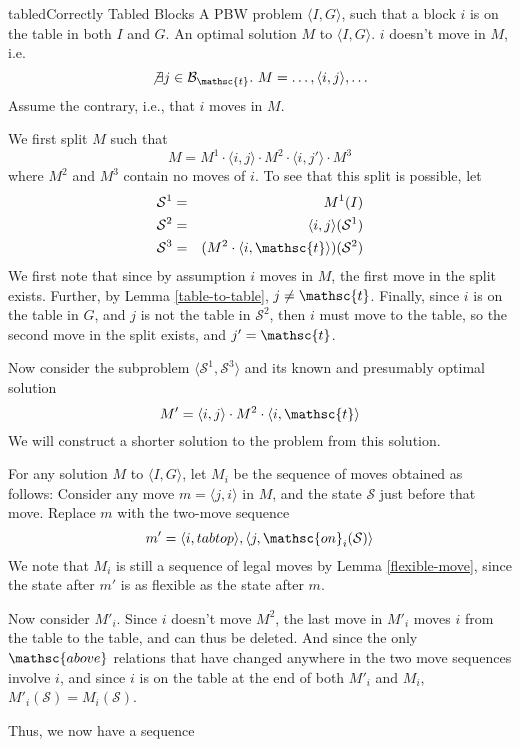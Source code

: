 \documentclass{article}
\newcommand{\have}{{.~}}
\newcommand{\bstate}{{\mathcal{S}}}
\newcommand{\blocks}{{\mathcal{B}}}
\newcommand{\tabtop}{{\mathsc{t}}}
\newcommand{\tblocks}{{\blocks_\tabtop}}
\newcommand{\bon}{{\mathsc{on}}}
\newcommand{\babove}{{\mathsc{above}}}
\begin{document}
\begin{lemma}{tabled}{Correctly Tabled Blocks}
\given
A PBW problem $\langle I, G \rangle$, such that
a block $i$ is on the table in both $I$ and $G$.
An optimal solution $M$ to $\langle I, G \rangle$.
\prove
$i$ doesn't move in $M$, i.e. $$
  \not\exists j \in \tblocks \have
    M = \ldots, \langle i, j \rangle, \ldots
$$
\proof
Assume the contrary, i.e., that $i$ moves in $M$.

We first split $M$ such that $$
  M = M^1 \cdot \langle i, j \rangle \cdot M^2 \cdot
  \langle i, j' \rangle \cdot M^3
$$
where $M^2$ and $M^3$ contain no moves of $i$.
To see that this split is possible, let
\begin{eqnarray*}
\bstate^1 &=& M^1(I) \\
\bstate^2 &=& \langle i, j \rangle(\bstate^1) \\
\bstate^3 &=& (M^2 \cdot \langle i, \tabtop \rangle)(\bstate^2)
\end{eqnarray*}
We first note
that since by assumption $i$ moves in $M$, the first
move in the split exists.  Further, by Lemma
\ref{table-to-table}, $j \neq \tabtop$.
Finally, since $i$ is on the table in $G$, and
$j$ is not the table in $\bstate^2$, then $i$ must move
to the table, so the second move in the split exists, and $j' = \tabtop$.

Now consider the subproblem $\langle \bstate^1, \bstate^3 \rangle$
and its known and presumably optimal solution $$
  M' = \langle i, j \rangle \cdot M^2 \cdot \langle i, \tabtop \rangle
$$
We will construct a shorter solution to the problem from this
solution.

For any solution $M$ to $\langle I, G \rangle$,
let $M_i$ be the sequence of moves obtained as follows:
Consider any move $m = \langle j, i \rangle$ in $M$, and the
state $\bstate$ just before that move.  Replace $m$ with the two-move
sequence $$
  m' = \langle i, tabtop \rangle, \langle j, \bon_i(\bstate) \rangle
$$
We note that $M_i$ is still a sequence of
legal moves by Lemma \ref{flexible-move}, since the state after $m'$
is as flexible as the state after $m$.

Now consider $M'_i$.  Since $i$ doesn't move $M^2$, the last
move in $M'_i$ moves $i$ from the table to the table, and can
thus be deleted.  And since the only $\babove$ relations that
have changed anywhere in the two move sequences involve $i$,
and since $i$ is on the table at the end of both $M'_i$ and $M_i$,
$M'_i(\bstate) = M_i(\bstate)$.

Thus, we now have a sequence 
\end{lemma}
\end{document}
